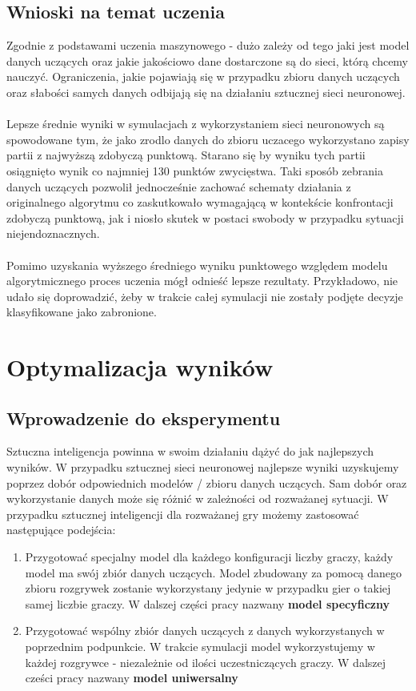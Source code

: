\documentclass[12pt, oneside]{report}
\begin{document}
\section{Wnioski na temat uczenia}
Zgodnie z podstawami uczenia maszynowego - dużo zależy od tego jaki jest model danych uczących oraz jakie jakościowo dane dostarczone są do sieci, którą chcemy nauczyć. Ograniczenia, jakie pojawiają się w przypadku zbioru danych uczących oraz słabości samych danych odbijają się na działaniu sztucznej sieci neuronowej. \\ \\ 
Lepsze średnie wyniki w symulacjach z wykorzystaniem sieci neuronowych są spowodowane tym, że jako zrodlo danych do zbioru uczacego wykorzystano zapisy partii z najwyższą zdobyczą punktową. Starano się by wyniku tych partii osiągnięto wynik co najmniej 130 punktów zwycięstwa. Taki sposób zebrania danych uczących pozwolił jednocześnie zachować schematy działania z originalnego algorytmu co zaskutkowało wymagającą w kontekście konfrontacji zdobyczą punktową, jak i niosło skutek w postaci swobody w przypadku sytuacji niejendoznacznych. \\ \\
Pomimo uzyskania wyższego średniego wyniku punktowego względem modelu algorytmicznego proces uczenia mógł odnieść lepsze rezultaty. Przykładowo, nie udało się doprowadzić, żeby w trakcie całej symulacji nie zostały podjęte decyzje klasyfikowane jako zabronione. 
\chapter{Optymalizacja wyników}
\section{Wprowadzenie do eksperymentu}
Sztuczna inteligencja powinna w swoim działaniu dążyć do jak najlepszych wyników. W przypadku sztucznej sieci neuronowej najlepsze wyniki uzyskujemy poprzez dobór odpowiednich modelów / zbioru danych uczących. Sam dobór oraz wykorzystanie danych może się różnić w zależności od rozważanej sytuacji. W przypadku sztucznej inteligencji dla rozważanej gry możemy zastosować następujące podejścia:

\begin{enumerate}
	\item Przygotować specjalny model dla każdego konfiguracji liczby graczy, każdy model ma swój zbiór danych uczących. Model zbudowany za pomocą danego zbioru rozgrywek zostanie wykorzystany jedynie w przypadku gier o takiej samej liczbie graczy. W dalszej części pracy nazwany \textbf{model specyficzny}
	\item Przygotować wspólny zbiór danych uczących z danych wykorzystanych w poprzednim podpunkcie. W trakcie symulacji model wykorzystujemy w każdej rozgrywce - niezależnie od ilości uczestniczących graczy. W dalszej cześci pracy nazwany \textbf{model uniwersalny}
\end{enumerate}
\end{document}
